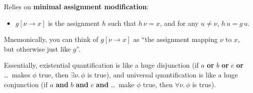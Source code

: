 \documentclass{article}
\newcommand{\ra}{\rightarrow}
\begin{document}
Relies on \textbf{minimal assignment modification}:
\begin{itemize}
  \item
    $g[\nu \ra x]$ is the assignment $h$ such that $h\,\nu = x$, and for any
    $u  \neq \nu$, $h\,u = g\,u$.
\end{itemize}

Mnemonically, you can think of $g[\nu \ra x]$ as ``the assignment mapping $\nu$
to $x$, but otherwise just like $g$''.

Essentially, existential quantification is like a huge disjunction (if $a$
\textbf{or} $b$ \textbf{or} $c$ \textbf{or} \dots\ makes $\phi$ true, then
$\exists \nu.\,\phi$ is true), and universal quantification is like a huge
conjunction (if $a$ \textbf{and} $b$ \textbf{and} $c$ \textbf{and} \dots\ make
$\phi$ true, then $\forall \nu.\,\phi$ is true).
\end{document}
